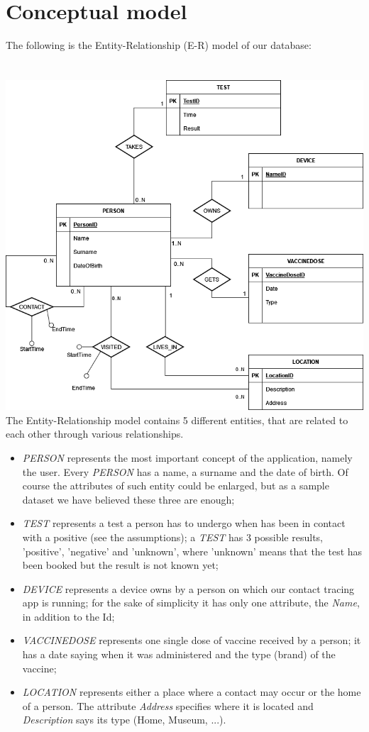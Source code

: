 \documentclass{article}
\begin{document}
\section{Conceptual model}
The following is the Entity-Relationship (E-R) model of our database:\\ \\ \\
\vspace{1cm}
\includegraphics[scale=0.5]{images/e-r.png}
The Entity-Relationship model contains 5 different entities, that are related to each other through various relationships.
\begin{itemize}
    \item \textit{PERSON} represents the most important concept of the application, namely the user. Every \textit{PERSON} has a name, a surname and the date of birth. Of course the attributes of such entity could be enlarged, but as a sample dataset we have believed these three are enough;
    \item \textit{TEST} represents a test a person has to undergo when has been in contact with a positive (see the assumptions); a \textit{TEST} has 3 possible results, 'positive', 'negative' and 'unknown', where 'unknown' means that the test has been booked but the result is not known yet;
    \item \textit{DEVICE} represents a device owns by a person on which our contact tracing app is running; for the sake of simplicity it has only one attribute, the \textit{Name}, in addition to the Id;
    \item \textit{VACCINEDOSE} represents one single dose of vaccine received by a person; it has a date saying when it was administered and the type (brand) of the vaccine;
    \item \textit{LOCATION} represents either a place where a contact may occur or the home of a person. The attribute \textit{Address} specifies where it is located and \textit{Description} says its type (Home, Museum, ...).
\end{itemize}
\end{document}
